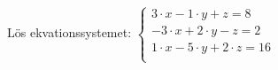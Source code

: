 Lös ekvationssystemet: 
\begin{math}
	\begin{cases}
	3 \cdot x - 1 \cdot y  + z = 8 \\
	-3 \cdot x + 2 \cdot y -z = 2 \\
	1 \cdot x - 5 \cdot y  + 2 \cdot z = 16 \\
	\end{cases}
\end{math}